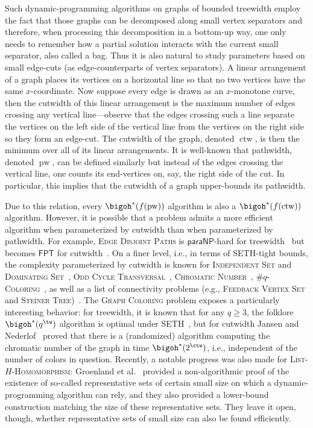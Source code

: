\documentclass[a4paper,UKenglish,cleveref, autoref, thm-restate]{lipics-v2021}
\begin{document}
Such dynamic-programming algorithms on graphs of bounded treewidth employ the fact that those graphs can be decomposed along small vertex separators and therefore, when processing this decomposition in a bottom-up way, one only needs to remember how a partial solution interacts with the current small separator, also called a bag.
Thus it is also natural to study parameters based on small edge-cuts (as edge-counterparts of vertex separators).
A linear arrangement of a graph places its vertices on a horizontal line so that no two vertices have the same $x$-coordinate.
Now suppose every edge is drawn as an $x$-monotone curve, then the cutwidth of this linear arrangement is the maximum number of edges crossing any vertical line---observe that the edges crossing such a line separate the vertices on the left side of the vertical line from the vertices on the right side so they form an edge-cut. 
The cutwidth of the graph, denoted $\operatorname{ctw}$, is then the minimum over all of its linear arrangements.
It is well-known that pathwidth, denoted $\operatorname{pw}$, can be defined similarly but instead of the edges crossing the vertical line, one counts its end-vertices on, say, the right side of the cut.
In particular, this implies that the cutwidth of a graph upper-bounds its pathwidth. 

Due to this relation, every $\bigoh^*(f(\operatorname{pw}))$ algorithm is also a  $\bigoh^*(f(\operatorname{ctw}))$ algorithm.
However, it is possible that a problem admits a more efficient algorithm when parameterized by cutwidth than when parameterized by pathwidth.
For example, \textsc{Edge Disjoint Paths} is $\mathsf{paraNP}$-hard for treewidth~\cite{NISHIZEKI2001177} but becomes $\mathsf{FPT}$ for cutwidth~\cite{DBLP:journals/algorithmica/GanianO21}.
On a finer level, i.e., in terms of SETH-tight bounds, the complexity parameterized by cutwidth is known for \textsc{Independent Set} and \textsc{Dominating Set}~\cite{DBLP:journals/jgaa/GeffenJKM20}, \textsc{Odd Cycle Transversal}~\cite{DBLP:conf/stacs/BojikianCHK23}, \textsc{Chromatic Number}~\cite{DBLP:journals/tcs/JansenN19}, \#$q$-\textsc{Coloring}~\cite{DBLP:conf/stacs/GroenlandMNS22}, as well as a list of connectivity problems (e.g., \textsc{Feedback Vertex Set} and \textsc{Steiner Tree})~\cite{DBLP:conf/stacs/BojikianCHK23}.
The \textsc{Graph Coloring} problem exposes a particularly interesting behavior: for treewidth, it is known that for any $q \geq 3$, the folklore $\bigoh^*(q^{\operatorname{\tw}})$ algorithm is optimal under SETH~\cite{DBLP:journals/talg/LokshtanovMS18}, but for cutwidth Jansen and Nederlof~\cite{DBLP:journals/tcs/JansenN19} proved that there is a (randomized) algorithm computing the chromatic number of the graph in time $\bigoh^*(2^{\operatorname{\ctw}})$, i.e., independent of the number of colors in question.
Recently, a notable progress was also made for \textsc{List-$H$-Homomorphism}: Groenland et al.~\cite{DBLP:conf/icalp/GroenlandMNPR24} provided a non-algorithmic proof of the existence of so-called representative sets of certain small size on which a dynamic-programming algorithm can rely, and they also provided a lower-bound construction matching the size of these representative sets.
They leave it open, though, whether representative sets of small size can also be found efficiently.
\end{document}
